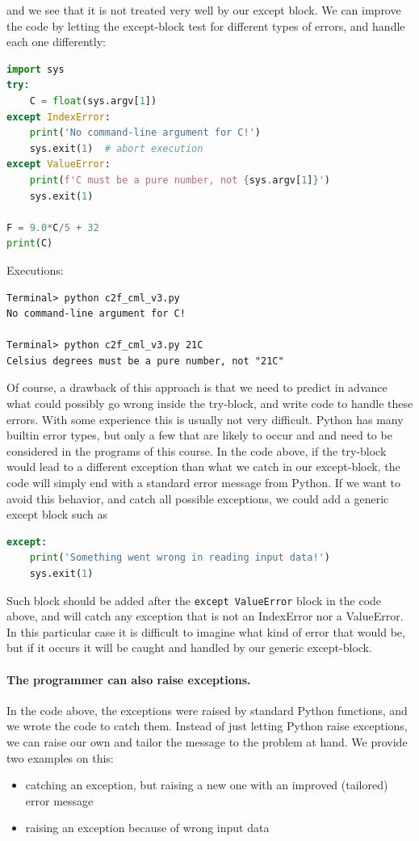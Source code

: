 \documentclass[graybox,envcountchap,sectrefs,final]{svmonodo}
\begin{document}
and we see that it is not treated very well by our except block. We can improve the code by letting the except-block
test for different types of errors, and handle each one differently:
\begin{lstlisting}[language=Python,style=blue1]
import sys
try:
    C = float(sys.argv[1])
except IndexError:
    print('No command-line argument for C!')
    sys.exit(1)  # abort execution
except ValueError:
    print(f'C must be a pure number, not {sys.argv[1]}')
    sys.exit(1)

F = 9.0*C/5 + 32
print(C)
\end{lstlisting}

Executions:

\begin{Verbatim}[frame=lines,label=\fbox{{\tiny Terminal}},framesep=2.5mm,framerule=0.7pt]
Terminal> python c2f_cml_v3.py
No command-line argument for C!

Terminal> python c2f_cml_v3.py 21C
Celsius degrees must be a pure number, not "21C"
\end{Verbatim}
Of course, a drawback of this approach is that we need to predict in advance what could possibly go wrong inside the
try-block, and write code to handle these errors. With some experience this is usually not very difficult. Python has
many builtin error types, but only a few that are likely to occur and and need to be considered in the programs of this
course. In the code above, if the try-block would lead to a different exception than what we catch in our except-block,
the code will simply end with a standard error message from Python. If we want to avoid this behavior, and catch all
possible exceptions, we could add a generic except block such as
\begin{lstlisting}[language=Python,style=blue1]
except:
    print('Something went wrong in reading input data!')
    sys.exit(1)
\end{lstlisting}
Such block should be added after the \texttt{except ValueError} block in the code above, and will catch any exception that is
not an IndexError nor a ValueError. In this particular case it is difficult to imagine what kind of error that would be,
but if it occurs it will be caught and handled by our generic except-block.


\paragraph{The programmer can also raise exceptions.}
In the code above, the exceptions were raised by standard Python functions, and we wrote the code to catch them.
Instead of just letting Python raise exceptions, we can raise our own and tailor the message to the problem at hand.
We provide two examples on this:
\begin{itemize}
  \item catching an exception, but raising a new one with an improved (tailored) error message

  \item raising an exception because of wrong input data
\end{itemize}
\end{document}
